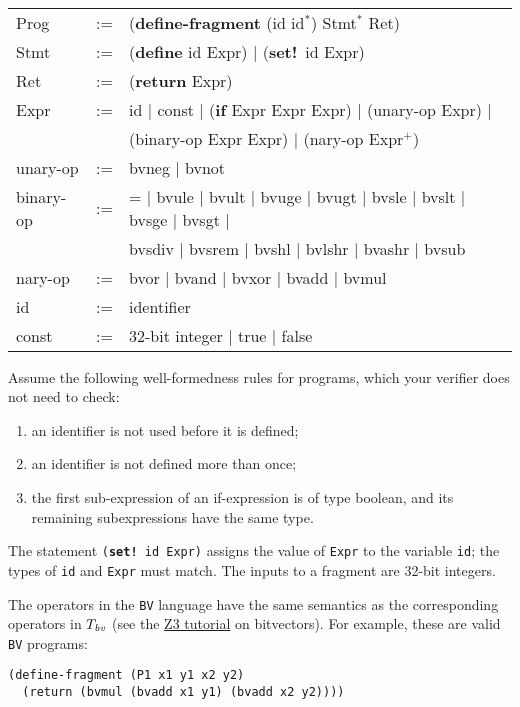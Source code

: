 \documentclass{handout}
\begin{document}
{\tt\small
\begin{tabular}{lcl}
Prog &:=&  (\textbf{define-fragment} (id id$^\mathtt{*}$) Stmt$^\mathtt{*}$ Ret) \\
Stmt &:=& (\textbf{define} id Expr) $|$ (\textbf{set!}\ id Expr) \\
Ret &:=& (\textbf{return} Expr) \\
Expr &:=& id $|$ const $|$ (\textbf{if} Expr Expr Expr) $|$ (unary-op Expr) $|$ \\
         &&(binary-op Expr Expr) $|$ (nary-op Expr$^\mathtt{+}$)\\
unary-op &:=& bvneg $|$ bvnot \\
binary-op &:=& = $|$ bvule $|$ bvult $|$ bvuge $|$ bvugt $|$ bvsle $|$ bvslt  $|$ bvsge $|$ bvsgt $|$  \\
                && bvsdiv $|$ bvsrem $|$ bvshl $|$ bvlshr $|$ bvashr $|$ bvsub\\
nary-op &:=& bvor $|$ bvand $|$ bvxor $|$  bvadd $|$  bvmul\\
id &:=& identifier\\
const &:=& 32-bit integer $|$ true $|$ false\\
\end{tabular}}

Assume the following well-formedness rules for programs, which your verifier
does not need to check:
\begin{enumerate}
\item an identifier is not used before it is defined;
\item an identifier is not defined more than once;
\item the first sub-expression of an if-expression is of type boolean, and its remaining subexpressions have the same type.
\end{enumerate}
The statement \texttt{(\textbf{set!}\ id Expr)}  assigns the value of
\texttt{Expr} to the variable \texttt{id}; the types of \texttt{id} and
\texttt{Expr} must match.  The inputs to a fragment are 32-bit integers.

The operators in the \texttt{BV} language have the same semantics as the
corresponding operators in $T_\emph{bv}$ (see the
\href{http://rise4fun.com/z3/tutorial}{Z3 tutorial} on bitvectors). For example,
these are valid \texttt{BV} programs:

\lstset{language=lisp}
\begin{lstlisting}
(define-fragment (P1 x1 y1 x2 y2)
  (return (bvmul (bvadd x1 y1) (bvadd x2 y2))))
\end{lstlisting}
\end{document}

